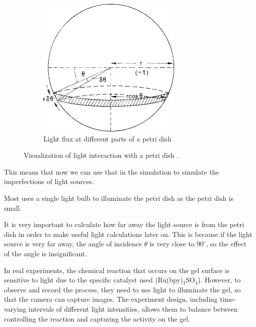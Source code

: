 \begin{figure}
\begin{subfigure}{.5\textwidth}
        \includegraphics[width=\linewidth]{sphere.jpg}
        \caption{Light flux at different parts of a petri dish}
        \label{fig:light-flux-petri-dish}
    \end{subfigure}
    \caption{Visualization of light interaction with a petri dish \citep{edwards_1970}.}
\end{figure}
This means that now we can use that in the simulation to simulate the imperfections of light sources. 

Most uses a single light bulb to illuminate the petri dish as the petri dish is small. 

It is very important to calculate how far away the light source is from the petri dish in order to make useful light calculations later on. This is because if the light source is very far away, the angle of incidence $\theta$ is very close to $90^\circ$, so the effect of the angle is insignificant.

In real experiments, the chemical reaction that occurs on the gel surface is sensitive to light due to the specific catalyst used (Ru(bpy)$_3$SO$_4$). 
However, to observe and record the process, they need to use light to illuminate the gel, so that the camera can capture images. The experiment design, including time-varying intervals of different light intensities, allows them to balance between controlling the reaction and capturing the activity on the gel. \cite{TOTH20091605}

